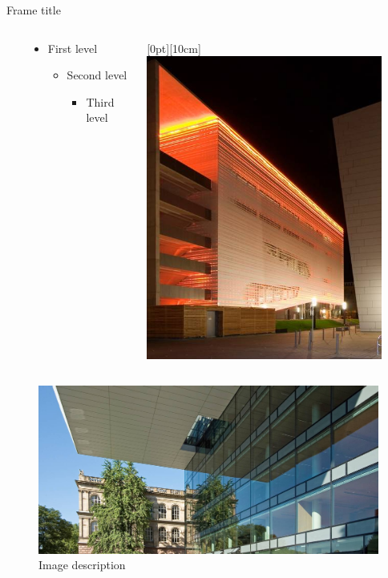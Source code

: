 \begin{frame}{Frame title}
\begin{columns}[onlytextwidth]\
  \begin{column}{.5\textwidth}
    \begin{itemize}
      \item First level
      \begin{itemize}
        \item Second level
        \begin{itemize}
          \item Third level
        \end{itemize}
      \end{itemize}
    \end{itemize}
  \end{column}
  \begin{column}{.5\textwidth}
    \hfill\raisebox{-10cm}[0pt][10cm]{\includegraphics[height=10cm]{figure.jpg}}
  \end{column}
\end{columns}
\end{frame}

\begin{frame}
\begin{figure}
\includegraphics[width=\textwidth]{title_large}
\caption{Image description}
\end{figure}
\end{frame}

